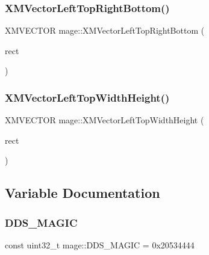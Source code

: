 \subsubsection{\texorpdfstring{X\+M\+Vector\+Left\+Top\+Right\+Bottom()}{XMVectorLeftTopRightBottom()}}
{\footnotesize\ttfamily X\+M\+V\+E\+C\+T\+OR mage\+::\+X\+M\+Vector\+Left\+Top\+Right\+Bottom (\begin{DoxyParamCaption}\item[{const R\+E\+CT \&}]{rect }\end{DoxyParamCaption})}

\hypertarget{namespacemage_abda051097e5b76fb65983141822cb170}{}\label{namespacemage_abda051097e5b76fb65983141822cb170} 
\subsubsection{\texorpdfstring{X\+M\+Vector\+Left\+Top\+Width\+Height()}{XMVectorLeftTopWidthHeight()}}
{\footnotesize\ttfamily X\+M\+V\+E\+C\+T\+OR mage\+::\+X\+M\+Vector\+Left\+Top\+Width\+Height (\begin{DoxyParamCaption}\item[{const R\+E\+CT \&}]{rect }\end{DoxyParamCaption})}



\subsection{Variable Documentation}
\hypertarget{namespacemage_a52f784e41b51fee843891c6b5e9be479}{}\label{namespacemage_a52f784e41b51fee843891c6b5e9be479} 
\subsubsection{\texorpdfstring{D\+D\+S\+\_\+\+M\+A\+G\+IC}{DDS\_MAGIC}}
{\footnotesize\ttfamily const uint32\+\_\+t mage\+::\+D\+D\+S\+\_\+\+M\+A\+G\+IC = 0x20534444}

\hypertarget{namespacemage_a73e54b9b368875ed0281ced59e2fca7e}{}\label{namespacemage_a73e54b9b368875ed0281ced59e2fca7e} 
